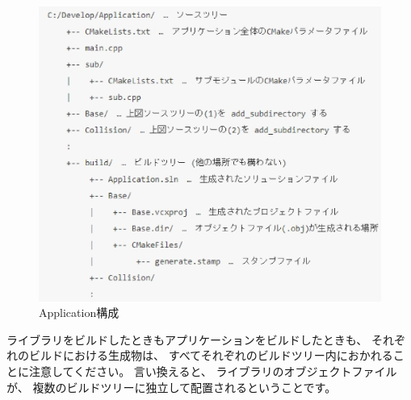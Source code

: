 \begin{narrow}
    \begin{figure}[h]
	\begin{center}
	\includegraphics[width=.9\textwidth]{fig/ApplicationTree.eps}
	\end{center}
	\caption{Application構成}
	\label{fig:ApplicationTree}
    \end{figure}
\end{narrow}

\medskip
ライブラリをビルドしたときもアプリケーションをビルドしたときも、
それぞれのビルドにおける生成物は、
すべてそれぞれのビルドツリー内におかれることに注意してください。
言い換えると、 ライブラリのオブジェクトファイルが、
複数のビルドツリーに独立して配置されるということです。

